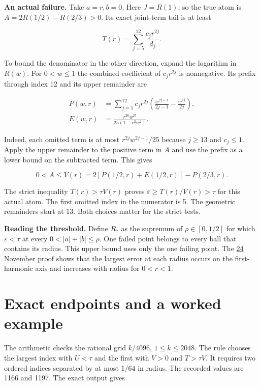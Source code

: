 \textbf{An actual failure.} Take \(a=r,b=0\). Here \(J=R(1)\), so the true atom is \(A=2R(1/2)-R(2/3)>0\). Its exact joint-term tail is at least

\[
T(r)=\sum_{j=5}^{12}\frac{c_jr^{2j}}{d_j}.
\]

To bound the denominator in the other direction, expand the logarithm in \(R(w)\). For \(0<w\le1\) the combined coefficient of \(c_jr^{2j}\) is nonnegative. Its prefix through index 12 and its upper remainder are

\[
\begin{aligned}
P(w,r)&=\sum_{j=1}^{12}c_jr^{2j}\left(\frac{w^{2j-1}}{2j-1}-\frac{w^{2j}}{2j}\right),\\
E(w,r)&=\frac{r^{26}w^{25}}{25(1-r^2w^2)}.
\end{aligned}
\]

Indeed, each omitted term is at most \(r^{2j}w^{2j-1}/25\) because \(j\ge13\) and \(c_j\le1\). Apply the upper remainder to the positive term in \(A\) and use the prefix as a lower bound on the subtracted term. This gives

\[
0<A\le V(r)=2[P(1/2,r)+E(1/2,r)]-P(2/3,r).
\]

The strict inequality \(T(r)>\tau V(r)\) proves \(\varepsilon\ge T(r)/V(r)>\tau\) for this actual atom. The first omitted index in the numerator is 5. The geometric remainders start at 13. Both choices matter for the strict tests.

\textbf{Reading the threshold.} Define \(R_*\) as the supremum of \(\rho\in[0,1/2]\) for which \(\varepsilon<\tau\) at every \(0<|a|+|b|\le\rho\). One failed point belongs to every ball that contains its radius. This upper bound uses only the one failing point. The \href{https://github.com/sepahead/pid-rs/blob/main/audit/research/angular-truncation-extremum/EXPOSITION.md}{24 November proof} shows that the largest error at each radius occurs on the first-harmonic axis and increases with radius for \(0<r<1\).

\clearpage

\section{Exact endpoints and a worked example}\label{exact-endpoints-and-a-worked-example}

The arithmetic checks the rational grid \(k/4096\), \(1\le k\le2048\). The rule chooses the largest index with \(U<\tau\) and the first with \(V>0\) and \(T>\tau V\). It requires two ordered indices separated by at most \(1/64\) in radius. The recorded values are 1166 and 1197. The exact output gives


